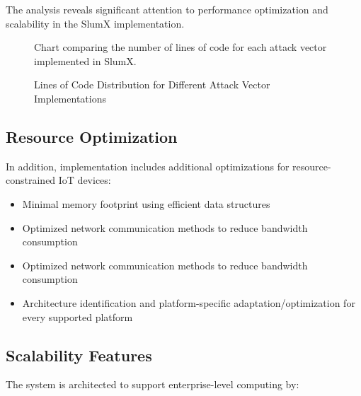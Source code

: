 \documentclass[12pt,letterpaper]{report}
\begin{document}
The analysis reveals significant attention to performance optimization and scalability in the SlumX implementation.

\begin{figure}[H]
\centering
{}
\caption{Lines of Code Distribution for Different Attack Vector Implementations}
\begin{center}\small Chart comparing the number of lines of code for each attack vector implemented in SlumX.\end{center}
\label{fig:attack_complexity}
\end{figure}

\subsection{Resource Optimization}

In addition, implementation includes additional optimizations for resource-constrained IoT devices: 

\begin{itemize}
    \item Minimal memory footprint using efficient data structures 
    \item Optimized network communication methods to reduce bandwidth consumption 
    \item Optimized network communication methods to reduce bandwidth consumption 
    \item Architecture identification and platform-specific adaptation/optimization for every supported platform 
\end{itemize}

\subsection{Scalability Features}

The system is architected to support enterprise-level computing by: 
\end{document}
